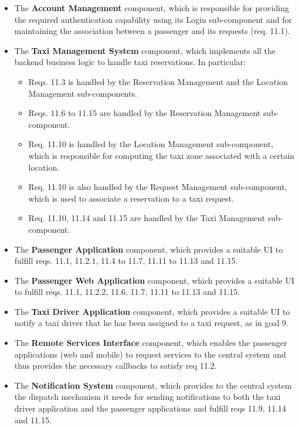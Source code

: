 \begin{itemize}
	\begin{itemize}
		\item The \textbf{Account Management} component, which is responsible for providing the required authentication capability using its Login sub-component and for maintaining the association between a passenger and its requests (req. 11.1).
		\item The \textbf{Taxi Management System} component, which implements all the backend business logic to handle taxi reservations. In particular:
		\begin{itemize}
		\item Reqs. 11.3 is handled by the Reservation Management and the Location Management sub-components.
		\item Reqs. 11.6 to 11.15 are handled by the Reservation Management sub-component.
		\item Req. 11.10 is handled by the Location Management sub-component, which is responsible for computing the taxi zone associated with a certain location.
		\item Req. 11.10 is also handled by the Request Management sub-component, which is used to associate a reservation to a taxi request. 
		\item Req. 11.10, 11.14 and 11.15 are handled by the Taxi Management sub-component.
		\end{itemize}	
		\item The \textbf{Passenger Application} component, which provides a suitable UI to fulfill reqs. 11.1, 11.2.1, 11.4 to 11.7, 11.11 to 11.13 and 11.15.
		\item The \textbf{Passenger Web Application} component, which provides a suitable UI to fulfill reqs. 11.1, 11.2.2, 11.6, 11.7, 11.11 to 11.13 and 11.15.
		\item The \textbf{Taxi Driver Application} component, which provides a suitable UI to notify a taxi driver that he has been assigned to a taxi request, as in goal 9.
		\item The \textbf{Remote Services Interface} component, which enables the passenger applications (web and mobile) to request services to the central system and thus provides the necessary callbacks to satisfy req 11.2.
		\item The \textbf{Notification System} component, which provides to the central system the dispatch mechanism it needs for sending notifications to both the taxi driver application and the passenger applications and fulfill reqs 11.9, 11.14 and 11.15.
		\end{itemize}

\end{itemize}
